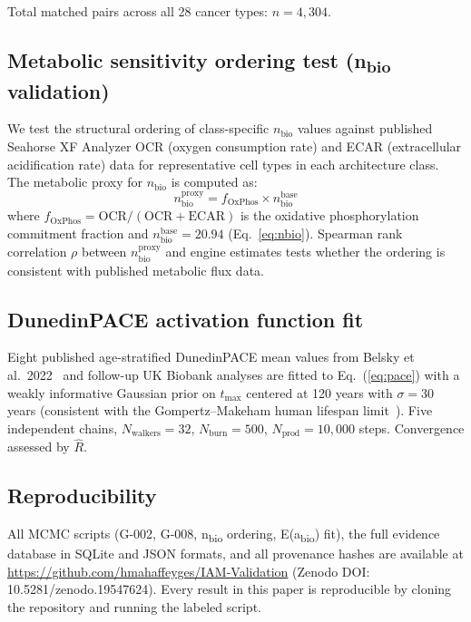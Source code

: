 \documentclass[12pt,a4paper]{article}
\newcommand{\nbio}{n_{\mathrm{bio}}}
\begin{document}
Total matched pairs across all 28 cancer types: $n = 4{,}304$.

\subsection{Metabolic sensitivity ordering test (n\textsubscript{bio} validation)}
\label{sec:nbio_methods}
\label{sec:nbio_validation}


We test the structural ordering of class-specific $\nbio$ values against
published Seahorse XF Analyzer OCR (oxygen consumption rate) and ECAR
(extracellular acidification rate) data for representative cell types in
each architecture class. The metabolic proxy for $\nbio$ is computed as:
\begin{equation}
  \nbio^{\mathrm{proxy}} = f_{\mathrm{OxPhos}} \times \nbio^{\mathrm{base}}
  \label{eq:nbio_proxy}
\end{equation}
where $f_{\mathrm{OxPhos}} = \mathrm{OCR}/(\mathrm{OCR} + \mathrm{ECAR})$
is the oxidative phosphorylation commitment fraction and $\nbio^{\mathrm{base}} =
20.94$ (Eq.~\ref{eq:nbio}). Spearman rank correlation $\rho$ between
$\nbio^{\mathrm{proxy}}$ and engine estimates tests whether the ordering is
consistent with published metabolic flux data.

\subsection{DunedinPACE activation function fit}
\label{sec:eabio_methods}

Eight published age-stratified DunedinPACE mean values from Belsky et al.\
2022~\cite{Belsky2022} and follow-up UK Biobank analyses are fitted to
Eq.~(\ref{eq:pace}) with a weakly informative Gaussian prior on $t_{\max}$
centered at 120 years with $\sigma = 30$ years (consistent with the
Gompertz--Makeham human lifespan limit~\cite{Gompertz1825,Makeham1860}).
Five independent chains, $N_{\mathrm{walkers}} = 32$, $N_{\mathrm{burn}} = 500$,
$N_{\mathrm{prod}} = 10{,}000$ steps. Convergence assessed by $\hat{R}$.

\subsection{Reproducibility}
All MCMC scripts (G-002, G-008, n\textsubscript{bio} ordering, E(a\textsubscript{bio}) fit),
the full evidence database in SQLite and JSON formats, and all provenance hashes
are available at \url{https://github.com/hmahaffeyges/IAM-Validation}
(Zenodo DOI: 10.5281/zenodo.19547624). Every result in this paper is
reproducible by cloning the repository and running the labeled script.
\end{document}

